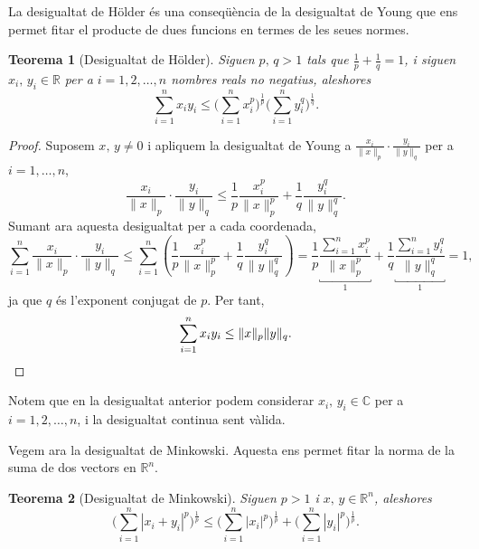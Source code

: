 \documentclass[12pt]{book}
\newtheorem{teorema}{Teorema}[chapter]
\theoremstyle{definition}
\theoremstyle{nota}
\theoremstyle{exemple}
\begin{document}
La desigualtat de Hölder és una conseqüència de la desigualtat de
Young que ens permet fitar el producte de dues funcions en termes de
les seues normes.

\begin{teorema}[Desigualtat de Hölder]
  Siguen $p,\, q > 1$ tals que $\frac{1}{p} + \frac{1}{q} = 1$, i
  siguen $x_i,\, y_i \in \mathbb{R}$ per a $i = 1, 2, \dotsc, n$
  nombres reals no negatius, aleshores
  \[
    \sum_{i=1}^{n} x_i y_i \leq
    \Big( \sum_{i=1}^{n} x_i^p \Big)^{\frac{1}{p}}
    \Big( \sum_{i=1}^{n} y_i^q \Big)^{\frac{1}{q}}.
  \]
\end{teorema}

\begin{proof}
  Suposem $x,\, y \neq 0$ i apliquem la desigualtat de Young a
  $\frac{x_i}{\|x\|_p} \cdot \frac{y_i}{\|y\|_q}$ per a
  $i = 1, \dotsc, n$,
  \[
    \frac{x_i}{\|x\|_p} \cdot \frac{y_i}{\|y\|_q} \leq
    \frac{1}{p} \frac{x_i^p}{\|x\|_p^p} +
    \frac{1}{q} \frac{y_i^q}{\|y\|_q^q}.
  \]
  Sumant ara aquesta desigualtat per a cada coordenada,
  \begin{equation*}
    \sum_{i=1}^{n} \frac{x_i}{\|x\|_p} \cdot \frac{y_i}{\|y\|_q}
    \leq \sum_{i=1}^{n} \left( \frac{1}{p} \frac{x_i^p}{\|x\|_p^p} +
      \frac{1}{q} \frac{y_i^q}{\|y\|_q^q} \right)
    = \frac{1}{p}
    \underbracket{\frac{\sum_{i=1}^{n} x_i^p}{\|x\|_p^p}}_1 +
    \frac{1}{q}
    \underbracket{\frac{\sum_{i=1}^{n} y_i^q}{\|y\|_q^q}}_1 = 1,
  \end{equation*}
  ja que $q$ és l'exponent conjugat de $p$. Per tant,
  \[
    \sum_{i=1}^{n} x_iy_i \leq \|x\|_p \|y\|_q.\qedhere
  \]
\end{proof}

Notem que en la desigualtat anterior podem considerar
$x_i, \, y_i \in \mathbb{C}$ per a $i = 1, 2, \dotsc, n$, i la
desigualtat continua sent vàlida.

Vegem ara la desigualtat de Minkowski. Aquesta ens permet fitar la
norma de la suma de dos vectors en $\mathbb{R}^n$.

\begin{teorema}[Desigualtat de Minkowski]
  Siguen $p > 1$ i $x,\, y \in \mathbb{R}^n$, aleshores
  \[
    \Big( \sum_{i=1}^{n} |x_i + y_i|^p \Big)^{\frac{1}{p}} \leq
    \Big( \sum_{i=1}^{n} |x_i|^p \Big)^{\frac{1}{p}} +
    \Big( \sum_{i=1}^{n} |y_i|^p \Big)^{\frac{1}{p}}.
  \]
\end{teorema}
\end{document}

